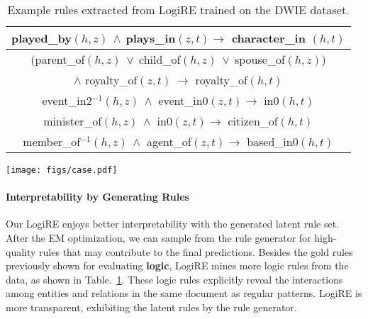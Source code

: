 \documentclass[11pt]{article}
\newcommand{\mymodel}{LogiRE\xspace}
\begin{document}
\begin{table}[t]
    \small
    \centering
    \begin{tabular}{c}
    \toprule
        played\_by$(h, z)\ \land\ $plays\_in$(z, t) \rightarrow$ character\_in $(h, t)$  \\ \hline
        (parent\_of$(h, z)\ \lor \ $child\_of$(h, z)\ \lor \ $spouse\_of$(h, z)$) \\ $\land$ royalty\_of$(z, t)\ \rightarrow$ royalty\_of$(h,t)$  \\ \hline
        event\_in2$^{-1}(h,z)\ \land$ event\_in0$(z, t)\rightarrow$ in0$(h, t)$ \\ \hline
        minister\_of$(h, z)\ \land$ in0$(z, t)\rightarrow$ citizen\_of$(h, t)$ \\ \hline
        member\_of$^{-1}(h, z)\ \land$ agent\_of$(z, t)\rightarrow$ based\_in0$(h, t)$\\
        \bottomrule
    \end{tabular}
    \caption{Example rules extracted from \mymodel trained on the DWIE dataset.}
    \label{tab:induct}
\end{table}

\begin{figure*}
    \centering
    \texttt{[image: figs/case.pdf]}
    \caption{Inference cases of our \mymodel on DWIE by using ATLOP as the backbone model. The grey arrows are relations extracted by the backbone model, solid lines representing true relations while dashed lines representing false relations. The green arrows are new relations correctly extracted by logical reasoning. The blue arrows indicate the potential reasoning paths. We also demonstrate a negative case. In the third example, the red arrow represents a wrong relation extracted by reasoning over wrongly estimated atoms.}
    \label{fig:case-study}
\end{figure*}

\paragraph{Interpretability by Generating Rules}
Our \mymodel enjoys better interpretability with the generated latent rule set. After the EM optimization, we can sample from the rule generator for high-quality rules that may contribute to the final predictions. Besides the gold rules previously shown for evaluating \textbf{logic}, \mymodel mines more logic rules from the data, as shown in Table.~\ref{tab:induct}. These logic rules explicitly reveal the interactions among entities and relations in the same document as regular patterns. \mymodel is more transparent, exhibiting the latent rules by the rule generator.
\end{document}
